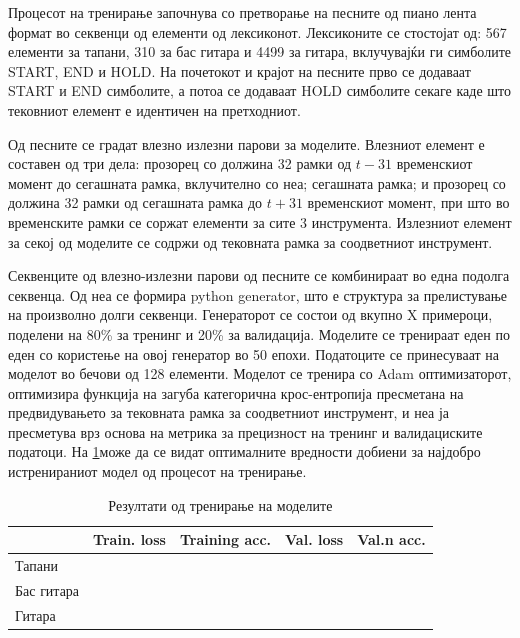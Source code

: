 Процесот на тренирање започнува со претворање на песните од пиано лента формат во секвенци од елементи од лексиконот. Лексиконите се стостојат од: 567 елементи за тапани, 310 за бас гитара и 4499 за гитара, вклучувајќи ги симболите START, END и HOLD. На почетокот и крајот на песните прво се додаваат  START и END симболите, а потоа се додаваат HOLD симболите секаге каде што тековниот елемент е идентичен на претходниот. 

Од песните се градат влезно излезни парови за моделите. Влезниот елемент е составен од три дела: прозорец со должина 32 рамки од $t-31$ временскиот момент до сегашната рамка, вклучително со неа; сегашната рамка; и прозорец со должина 32 рамки од сегашната рамка до $t+31$ временскиот момент, при што во временските рамки се соржат елементи за сите 3 инструмента. Излезниот елемент за секој од моделите се содржи од тековната рамка за соодветниот инструмент.

Секвенците од влезно-излезни парови од песните се комбинираат во една подолга секвенца. Од неа се формира python generator, што е структура за прелистување на произволно долги секвенци. Генераторот се состои од вкупно X примероци, поделени на 80\% за тренинг и 20\% за валидација. Моделите се тренираат еден по еден со користење на овој генератор во 50 епохи. Податоците се принесуваат на моделот во бечови од 128 елементи. Моделот се тренира со Adam оптимизаторот, оптимизира функција на загуба категорична крос-ентропија пресметана на предвидувањето за тековната рамка за соодветниот инструмент, и неа ја пресметува врз основа на метрика за прецизност на тренинг и валидациските податоци. На \ref{tab:trening}може да се видат оптималните вредности добиени за најдобро истренираниот модел од процесот на тренирање.

\begin{table}[H]
\centering
\begin{tabular}{@{}lllll@{}}
\toprule
           & \multicolumn{1}{c}{Train. loss} & Training acc. & Val. loss & Val.n acc. \\ \midrule
Тапани     &                                   &                   &                 &                     \\
Бас гитара &                                   &                   &                 &                     \\
Гитара     &                                   &                   &                 &                     \\ \bottomrule
\end{tabular}
\caption{Резултати од тренирање на моделите}
\label{tab:trening}
\end{table}

